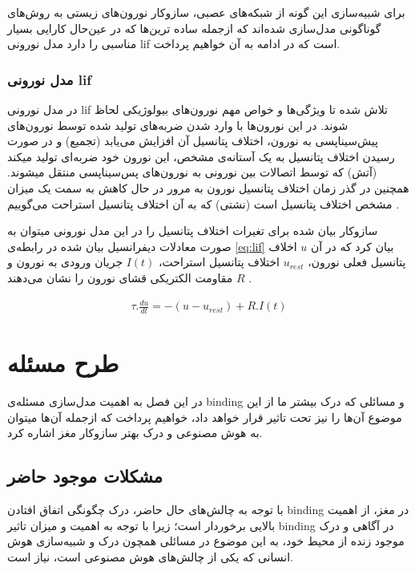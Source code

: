 \documentclass[12pt]{report}
\begin{document}
	برای شبیه‌سازی این گونه از شبکه‌های عصبی، سازوکار نورون‌های زیستی به روش‌‌های گوناگونی مدل‌سازی شده‌اند که ازجمله ساده ترین‌ها که در عین‌حال کارایی بسیار مناسبی را دارد مدل نورونی \gls{lif} است که در ادامه به آن خواهیم پرداخت.
	
	
	\subsection{مدل نورونی \gls{lif}}
	در مدل نورونی \gls{lif} تلاش شده تا ویژگی‌ها و خواص مهم نورون‌های بیولوژیکی لحاظ شوند. در این نورون‌ها با وارد شدن ضربه‌های تولید شده توسط نورون‌های پیش‌سیناپسی به نورون، اختلاف پتانسیل آن افزایش می‌یابد (تجمیع) و در صورت رسیدن اختلاف پتانسیل به یک آستانه‌ی مشخص، این نورون خود ضربه‌ای تولید میکند (آتش) که توسط اتصالات بین نورونی به نورون‌های پس‌سیناپسی منتقل میشوند. همچنین در گذر زمان اختلاف پتانسیل نورون به مرور در حال کاهش به سمت یک میزان مشخص اختلاف پتانسیل است (نشتی) که به آن اختلاف پتانسیل استراحت می‌گوییم
	\cite{gerstner2014neuronal}.
	
	ساز‌وکار بیان شده برای تغیرات اختلاف پتانسیل را در این مدل نورونی میتوان به صورت معادلات دیفرانسیل بیان شده در رابطه‌ی \ref{eq:lif} بیان کرد که در آن $u$ اخلاف پتانسیل فعلی نورون، $u_{rest}$ اختلاف پتانسیل استراحت، $I(t)$ جریان ورودی به نورون و $R$ مقاومت الکتریکی قشای نورون را نشان می‌دهند
	\cite{gerstner2014neuronal}.
	
	\begin{align}
		\tau . \frac{du}{dt} = -(u - u_{rest}) + R . I(t) 
		\label{eq:lif}
	\end{align}
	
	
	\chapter{طرح مسئله}
	
	در این فصل به اهمیت مدل‌سازی مسئله‌ی \gls{binding} و مسائلی که درک بیشتر ما از این موضوع آن‌ها را نیز تحت تاثیر قرار خواهد داد، خواهیم پرداخت که از‌جمله آن‌ها میتوان به هوش مصنوعی و درک بهتر ساز‌وکار مغز اشاره کرد.
	
	\section{مشکلات موجود حاضر}
	
	با توجه به چالش‌های حال حاضر، درک چگونگی اتفاق افتادن \gls{binding} در مغز، از اهمیت بالایی برخوردار است؛ زیرا با توجه به اهمیت و میزان تاثیر \gls{binding} در آگاهی و درک موجود زنده از محیط خود، به این موضوع در مسائلی همچون درک و شبیه‌سازی هوش انسانی که یکی از چالش‌های هوش مصنوعی است، نیاز است.
	
\end{document}

